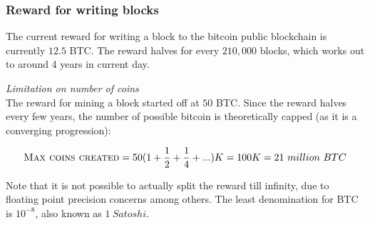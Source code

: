 \documentclass[10pt,a4paper]{article}
\begin{document}
\subsubsection{Reward for writing blocks}
The current reward for writing a block to the bitcoin public blockchain is currently $12.5$ BTC. The reward halves for every $210,000$ blocks, which works out to around 4 years in current day. 

\emph{Limitation on number of coins}\\
The reward for mining a block started off at $50$ BTC. Since the reward halves every few years, the number of possible bitcoin is theoretically capped (as it is a converging progression):
\begin{center}
    $$
    \textsc{Max coins created} = 50  (1 + \frac{1}{2} + \frac{1}{4} + ... ) K\\
    = 100K\\
    = 21 \ million \ BTC
    $$
\end{center}

Note that it is not possible to actually split the reward till infinity, due to floating point precision concerns among others. The least denomination for BTC is $ 10^{-8} $, also known as $1 \ Satoshi$.







% 
% 
\end{document}
